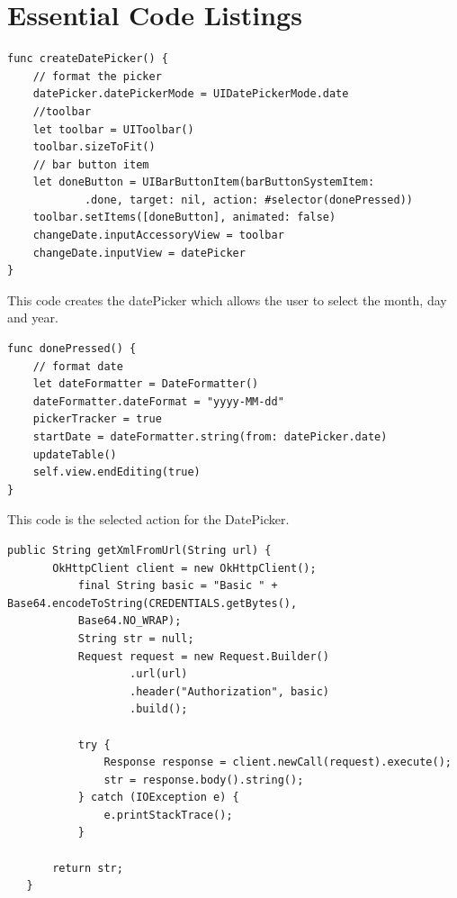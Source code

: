 \documentclass[letterpaper,10pt,draftclsnofoot,onecolumn,titlepage]{IEEEtran}
\begin{document}
	
	

	\appendices

	\section{Essential Code Listings}

	\begin{lstlisting}[caption=iOS EventViewController Snippet]
func createDatePicker() {
    // format the picker
    datePicker.datePickerMode = UIDatePickerMode.date
    //toolbar
    let toolbar = UIToolbar()
    toolbar.sizeToFit()
    // bar button item
    let doneButton = UIBarButtonItem(barButtonSystemItem:
			.done, target: nil, action: #selector(donePressed))
    toolbar.setItems([doneButton], animated: false)
    changeDate.inputAccessoryView = toolbar
    changeDate.inputView = datePicker
}
\end{lstlisting}

This code creates the datePicker which allows the user to select the month, day and year.

\begin{lstlisting}[caption=iOS EventViewController Snippet]
func donePressed() {
    // format date
    let dateFormatter = DateFormatter()
    dateFormatter.dateFormat = "yyyy-MM-dd"
    pickerTracker = true
    startDate = dateFormatter.string(from: datePicker.date)
    updateTable()
    self.view.endEditing(true)
}
\end{lstlisting}

This code is the selected action for the DatePicker.

\begin{lstlisting}[caption=Android XML Parser]
 public String getXmlFromUrl(String url) {
       OkHttpClient client = new OkHttpClient();
           final String basic = "Basic " + Base64.encodeToString(CREDENTIALS.getBytes(),
           Base64.NO_WRAP);
           String str = null;
           Request request = new Request.Builder()
                   .url(url)
                   .header("Authorization", basic)
                   .build();

           try {
               Response response = client.newCall(request).execute();
               str = response.body().string();
           } catch (IOException e) {
               e.printStackTrace();
           }

       return str;
   }
\end{lstlisting}
\end{document}
